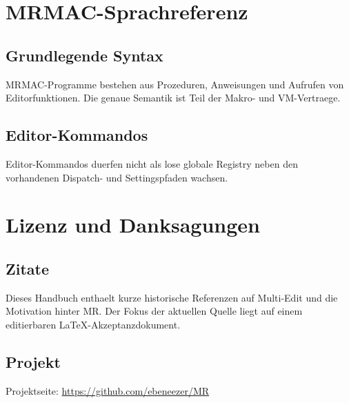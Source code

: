 \documentclass[a4paper,11pt]{report}
\newcommand{\mr}{\textsc{MR}}
\newcommand{\mrmac}{\textsc{MRMAC}}
\begin{document}
\appendix

\chapter{MRMAC-Sprachreferenz}

\section{Grundlegende Syntax}

\mrmac{}-Programme bestehen aus Prozeduren, Anweisungen und Aufrufen von
Editorfunktionen. Die genaue Semantik ist Teil der Makro- und VM-Vertraege.

\section{Editor-Kommandos}

Editor-Kommandos duerfen nicht als lose globale Registry neben den vorhandenen
Dispatch- und Settingspfaden wachsen.

\chapter{Lizenz und Danksagungen}

\section{Zitate}

Dieses Handbuch enthaelt kurze historische Referenzen auf Multi-Edit und die
Motivation hinter \mr{}. Der Fokus der aktuellen Quelle liegt auf einem
editierbaren LaTeX-Akzeptanzdokument.

\section{Projekt}

Projektseite: \url{https://github.com/ebeneezer/MR}
\end{document}
